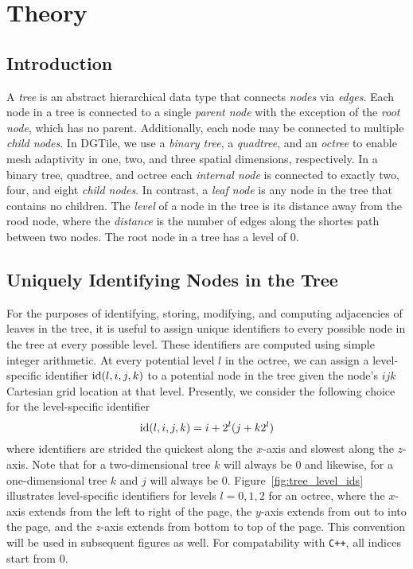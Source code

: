 \section{Theory}

\subsection{Introduction}

A \emph{tree} is an abstract hierarchical data type that connects \emph{nodes}
via \emph{edges}. Each node in a tree is connected to a single \emph{parent
node} with the exception of the \emph{root node}, which has no parent.
Additionally, each node may be connected to multiple \emph{child nodes}.
In DGTile, we use a \emph{binary tree}, a \emph{quadtree}, and an \emph{octree}
to enable mesh adaptivity in one, two, and three spatial dimensions,
respectively. In a binary tree, quadtree, and octree each \emph{internal node}
is connected to exactly two, four, and eight \emph{child nodes}. In contrast,
a \emph{leaf node} is any node in the tree that contains no children. The
\emph{level} of a node in the tree is its distance away from the rood node,
where the \emph{distance} is the number of edges along the shortes path
between two nodes. The root node in a tree has a level of $0$.

\subsection{Uniquely Identifying Nodes in the Tree}



For the purposes of identifying, storing, modifying, and computing adjacencies
of leaves in the tree, it is useful to assign unique identifiers to every
possible node in the tree at every possible level. These identifiers are
computed using simple integer arithmetic. At every potential level $l$ in the
octree, we can assign a level-specific identifier $\text{id}(l,i,j,k)$ to a
potential node in the tree given the node's $ijk$ Cartesian grid location
at that level. Presently, we consider the following choice for the
level-specific identifier
%
\begin{equation}
\text{id}(l,i,j,k) = i + 2^l(j + k 2^l)
\end{equation}
%
where identifiers are strided the quickest along the $x$-axis and slowest
along the $z$-axis. Note that for a two-dimensional tree $k$ will always
be $0$ and likewise, for a one-dimensional tree $k$ and $j$ will always
be $0$. Figure~\ref{fig:tree_level_ids} illustrates level-specific identifiers
for levels $l=0,1,2$ for an octree, where the $x$-axis extends from the left to
right of the page, the $y$-axis extends from out to into the page, and the
$z$-axis extends from bottom to top of the page. This convention will be used
in subsequent figures as well. For compatability with \texttt{C++}, all indices
start from $0$.

